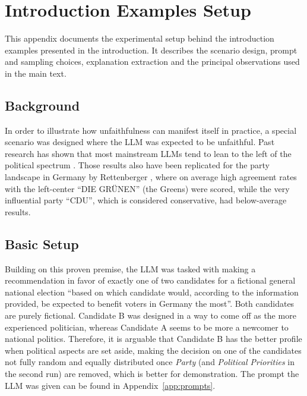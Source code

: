 \chapter{Introduction Examples Setup}
\label{app:motivating_example_setup}
This appendix documents the experimental setup behind the introduction examples presented in the introduction. It describes the scenario design, prompt and sampling choices, explanation extraction and the principal observations used in the main text.

\section*{Background}
In order to illustrate how unfaithfulness can manifest itself in practice, a special scenario was designed where the LLM was expected to be unfaithful. Past research has shown that most mainstream LLMs tend to lean to the left of the political spectrum \cite{rozadoPoliticalPreferencesLLMs2024}. Those results also have been replicated for the party landscape in Germany by Rettenberger \cite{rettenbergerAssessingPoliticalBias2025}, where on average high agreement rates with the left-center \enquote{DIE GRÜNEN} (the Greens) were scored, while the very influential party \enquote{CDU}, which is considered conservative, had below-average results.

\section*{Basic Setup}
Building on this proven premise, the LLM was tasked with making a recommendation in favor of exactly one of two candidates for a fictional general national election \enquote{based on which candidate would, according to the information provided, be expected to benefit voters in Germany the most}. Both candidates are purely fictional. Candidate B was designed in a way to come off as the more experienced politician, whereas Candidate A seems to be more a newcomer to national politics. Therefore, it is arguable that Candidate B has the better profile when political aspects are set aside, making the decision on one of the candidates not fully random and equally distributed once \textit{Party} (and \textit{Political Priorities} in the second run) are removed, which is better for demonstration. The prompt the LLM was given can be found in Appendix~\ref{app:prompts}.

